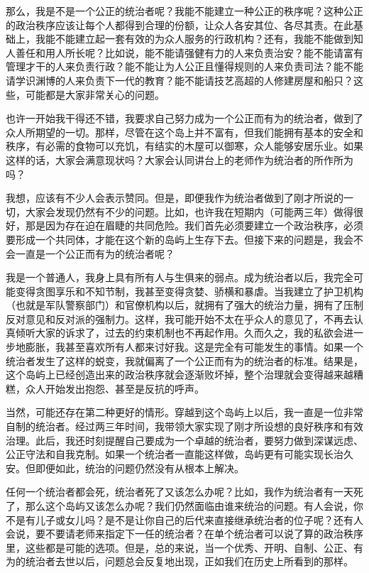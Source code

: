那么，我是不是一个公正的统治者呢？我能不能建立一种公正的秩序呢？这种公正的政治秩序应该让每个人都得到合理的份额，让众人各安其位、各尽其责。在此基础上，我能不能建立起一套有效的为众人服务的行政机构？还有，我能不能做到知人善任和用人所长呢？比如说，能不能请强健有力的人来负责治安？能不能请富有管理才干的人来负责行政？能不能让为人公正且懂得规则的人来负责司法？能不能请学识渊博的人来负责下一代的教育？能不能请技艺高超的人修建房屋和船只？这些，可能都是大家非常关心的问题。

也许一开始我干得还不错，我要求自己努力成为一个公正而有为的统治者，做到了众人所期望的一切。那样，尽管在这个岛上并不富有，但我们能拥有基本的安全和秩序，有必需的食物可以充饥，有结实的木屋可以御寒，众人能够安居乐业。如果这样的话，大家会满意现状吗？大家会认同讲台上的老师作为统治者的所作所为吗？

我想，应该有不少人会表示赞同。但是，即便我作为统治者做到了刚才所说的一切，大家会发现仍然有不少的问题。比如，也许我在短期内（可能两三年）做得很好，那是因为存在迫在眉睫的共同危险。我们首先必须要建立一个政治秩序，必须要形成一个共同体，才能在这个新的岛屿上生存下去。但接下来的问题是，我会不会一直是一个公正而有为的统治者呢？

我是一个普通人，我身上具有所有人与生俱来的弱点。成为统治者以后，我完全可能变得贪图享乐和不知节制，我甚至变得贪婪、骄横和暴虐。当我建立了护卫机构（也就是军队警察部门）和官僚机构以后，就拥有了强大的统治力量，拥有了压制反对意见和反对派的强制力。这样，我可能开始不太在乎众人的意见了，不再去认真倾听大家的诉求了，过去的约束机制也不再起作用。久而久之，我的私欲会进一步地膨胀，我甚至喜欢所有人都来讨好我。这是完全有可能发生的事情。如果一个统治者发生了这样的蜕变，我就偏离了一个公正而有为的统治者的标准。结果是，这个岛屿上已经创造出来的政治秩序就会逐渐败坏掉，整个治理就会变得越来越糟糕，众人开始发出抱怨、甚至是反抗的呼声。

当然，可能还存在第二种更好的情形。穿越到这个岛屿上以后，我一直是一位非常自制的统治者。经过两三年时间，我带领大家实现了刚才所设想的良好秩序和有效治理。此后，我还时刻提醒自己要成为一个卓越的统治者，要努力做到深谋远虑、公正守法和自我克制。如果一个统治者一直能这样做，岛屿更有可能实现长治久安。但即便如此，统治的问题仍然没有从根本上解决。

任何一个统治者都会死，统治者死了又该怎么办呢？比如，我作为统治者有一天死了，那么这个岛屿又该怎么办呢？我们仍然面临由谁来统治的问题。有人会说，你不是有儿子或女儿吗？是不是让你自己的后代来直接继承统治者的位子呢？还有人会说，要不要请老师来指定下一任的统治者？在单个统治者可以说了算的政治秩序里，这些都是可能的选项。但是，总的来说，当一个优秀、开明、自制、公正、有为的统治者去世以后，问题总会反复地出现，正如我们在历史上所看到的那样。

